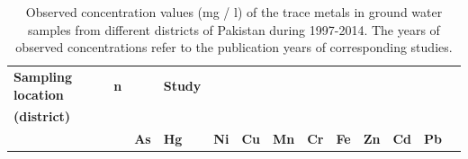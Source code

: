 \begin{landscape}

\begin{table}[hp!]

\label{Table D.1}

\caption{Observed concentration values (mg / l) of the trace metals in ground water samples from different districts of Pakistan during 1997-2014. The years of observed concentrations refer to the publication years of corresponding studies.}

\centering

\begin{threeparttable}

\begin{tabular}{>{\centering\arraybackslash}m{3.3cm}>{\centering\arraybackslash}m{0.5cm}>{\centering\arraybackslash}m{0.9cm}>{\centering\arraybackslash}m{0.8cm}>{\centering\arraybackslash}m{0.9cm}>{\centering\arraybackslash}m{0.8cm}>{\centering\arraybackslash}m{0.9cm}>{\centering\arraybackslash}m{1.0cm}>{\centering\arraybackslash}m{0.9cm}>{\centering\arraybackslash}m{0.9cm}>{\centering\arraybackslash}m{0.9cm}>{\centering\arraybackslash}m{0.9cm}>{\centering\arraybackslash}m{4.4cm}}

\toprule
\textbf{Sampling location} & \textbf{n} & \multicolumn{10}{c}{\textbf{Mean concentration}} & \textbf{Study}\\
\textbf{(district)} & & \multicolumn{10}{c}{\textbf{(mg/l)}} & \\
 & & \textbf{As} & \textbf{Hg} & \textbf{Ni} & \textbf{Cu} & \textbf{Mn} & \textbf{Cr} & \textbf{Fe} & \textbf{Zn} & \textbf{Cd} & \textbf{Pb} & \\

\midrule


\end{tabular}
\end{threeparttable}
\end{table}
\end{landscape}

